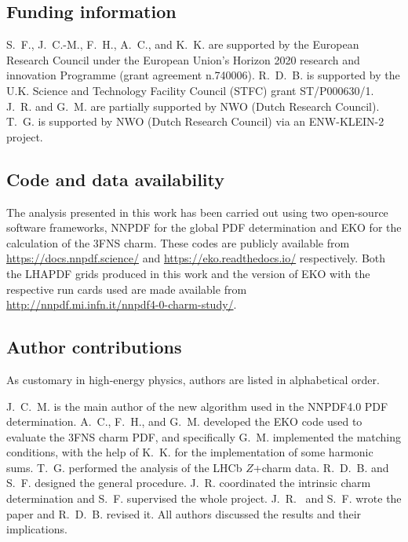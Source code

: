 \subsection*{Funding information}

S.~F., J.~C.-M., F.~H., A.~C., and K.~K. are supported by
the European Research Council under 
the European Union's Horizon 2020 research and innovation Programme
(grant agreement n.740006).
%
R.~D.~B. is supported by the U.K.
Science and Technology Facility Council (STFC) grant ST/P000630/1. 
%
J.~R. and G.~M. are partially supported by NWO (Dutch Research Council).
%
T.~G. is supported by NWO (Dutch Research Council) via an ENW-KLEIN-2 project.
%

\subsection*{Code and data availability}

The analysis presented in this work has been carried out using two
open-source software frameworks, \textsc{\small NNPDF} for the global
PDF determination and \textsc{\small EKO} for the calculation of the 3FNS charm.
%
These codes are publicly available from \url{https://docs.nnpdf.science/}
and \url{https://eko.readthedocs.io/} respectively.
%
Both the \textsc{\small LHAPDF} grids produced in this work and the version
of \textsc{\small EKO} with the respective run cards used are made available from
\url{http://nnpdf.mi.infn.it/nnpdf4-0-charm-study/}.

\subsection*{Author contributions}

As customary in high-energy physics, authors are listed
in alphabetical order.

J.~C.~M. is the main author of the new algorithm used in the NNPDF4.0
PDF determination.
A.~C., F.~H., and G.~M. developed the \textsc{\small EKO} code used
to evaluate the 3FNS charm PDF, and specifically G.~M. implemented the
matching conditions, with the help of K.~K. for the implementation of
some harmonic sums.
T.~G. performed the analysis of the LHCb $Z$+charm data.
R.~D.~B. and S.~F. designed the general procedure. J.~R. coordinated
the intrinsic charm determination and S.~F. supervised the whole
project. J.~R.~ and S.~F. wrote the paper and R.~D.~B. revised it.
All authors discussed the results and their implications.


